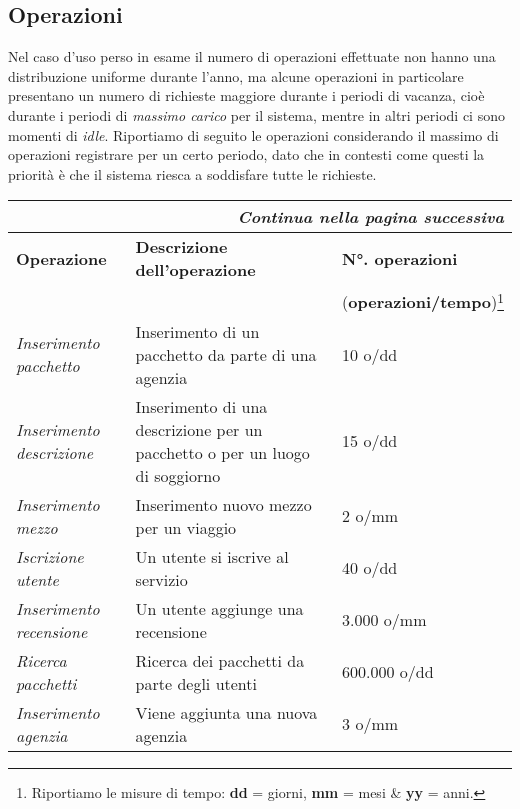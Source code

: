 \subsection{Operazioni}
Nel caso d'uso perso in esame il numero di operazioni effettuate non hanno una distribuzione uniforme durante l'anno, ma alcune operazioni in particolare presentano un numero di richieste maggiore durante i periodi di vacanza, cioè durante i periodi di \emph{massimo carico} per il sistema, mentre in altri periodi ci sono momenti di \emph{idle}. Riportiamo di seguito le operazioni considerando il massimo di operazioni registrare per un certo periodo, dato che in contesti come questi la priorità è che il sistema riesca a soddisfare tutte le richieste.
\newline
\begin{center}
    \begin{tabularx}{\textwidth}{p{} X p{}}
        \caption{Tabella delle operazioni}\\\toprule\endfirsthead
        \toprule\endhead
        \midrule\multicolumn{3}{r}{\itshape Continua nella pagina successiva}\\\midrule\endfoot
        \bottomrule\endlastfoot
        \textbf{Operazione} & \textbf{Descrizione dell'operazione} & \textbf{N°. operazioni}
        \\
        && (\textbf{operazioni/tempo})\footnote{Riportiamo le misure di tempo: \textbf{dd} = giorni, \textbf{mm} = mesi \& \textbf{yy} = anni.}
        \\\midrule
        \emph{Inserimento pacchetto} & Inserimento di un pacchetto da parte di una agenzia & 10 o/dd
        \\\midrule
        \emph{Inserimento descrizione} & Inserimento di una descrizione per un pacchetto o per un luogo di soggiorno & 15 o/dd
        \\\midrule
        \emph{Inserimento mezzo} & Inserimento nuovo mezzo per un viaggio & 2 o/mm
        \\\midrule
        \emph{Iscrizione utente} & Un utente si iscrive al servizio & 40 o/dd
        \\\midrule
        \emph{Inserimento recensione} & Un utente aggiunge una recensione & 3.000 o/mm
        \\\midrule
        \emph{Ricerca pacchetti} & Ricerca dei pacchetti da parte degli utenti & 600.000 o/dd
        \\\midrule
        \emph{Inserimento agenzia} & Viene aggiunta una nuova agenzia & 3 o/mm

\end{tabularx}
\end{center}
